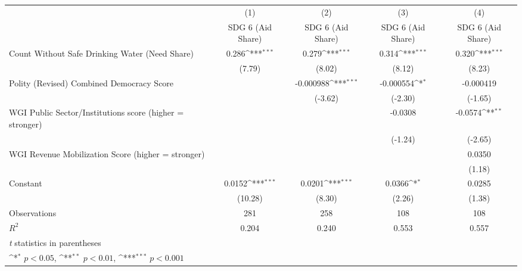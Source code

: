 {
\def\sym#1{\ifmmode^{#1}\else\(^{#1}\)\fi}
\begin{tabular}{l*{4}{c}}
\hline\hline
                &\multicolumn{1}{c}{(1)}&\multicolumn{1}{c}{(2)}&\multicolumn{1}{c}{(3)}&\multicolumn{1}{c}{(4)}\\
                &\multicolumn{1}{c}{SDG 6 (Aid Share)}&\multicolumn{1}{c}{SDG 6 (Aid Share)}&\multicolumn{1}{c}{SDG 6 (Aid Share)}&\multicolumn{1}{c}{SDG 6 (Aid Share)}\\
\hline
Count Without Safe Drinking Water (Need Share)&    0.286\sym{***}&    0.279\sym{***}&    0.314\sym{***}&    0.320\sym{***}\\
                &   (7.79)         &   (8.02)         &   (8.12)         &   (8.23)         \\
[1em]
Polity (Revised) Combined Democracy Score&                  &-0.000988\sym{***}&-0.000554\sym{*}  &-0.000419         \\
                &                  &  (-3.62)         &  (-2.30)         &  (-1.65)         \\
[1em]
WGI Public Sector/Institutions score (higher = stronger)&                  &                  &  -0.0308         &  -0.0574\sym{**} \\
                &                  &                  &  (-1.24)         &  (-2.65)         \\
[1em]
WGI Revenue Mobilization Score (higher = stronger)&                  &                  &                  &   0.0350         \\
                &                  &                  &                  &   (1.18)         \\
[1em]
Constant        &   0.0152\sym{***}&   0.0201\sym{***}&   0.0366\sym{*}  &   0.0285         \\
                &  (10.28)         &   (8.30)         &   (2.26)         &   (1.38)         \\
\hline
Observations    &      281         &      258         &      108         &      108         \\
\(R^{2}\)       &    0.204         &    0.240         &    0.553         &    0.557         \\
\hline\hline
\multicolumn{5}{l}{\footnotesize \textit{t} statistics in parentheses}\\
\multicolumn{5}{l}{\footnotesize \sym{*} \(p<0.05\), \sym{**} \(p<0.01\), \sym{***} \(p<0.001\)}\\
\end{tabular}
}
